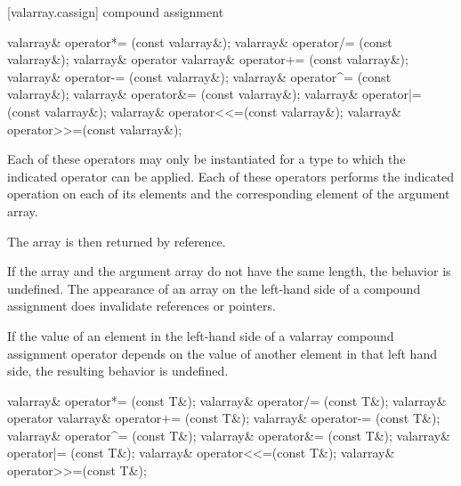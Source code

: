 [valarray.cassign]{ compound assignment}

%
%
%
%
%
%
%
%
%
%
\begin{itemdecl}
valarray& operator*= (const valarray&);
valarray& operator/= (const valarray&);
valarray& operator%
valarray& operator+= (const valarray&);
valarray& operator-= (const valarray&);
valarray& operator^= (const valarray&);
valarray& operator&= (const valarray&);
valarray& operator|= (const valarray&);
valarray& operator<<=(const valarray&);
valarray& operator>>=(const valarray&);
\end{itemdecl}

\begin{itemdescr}
\pnum
Each of these operators may only be instantiated for a type 
to which the indicated operator can be applied.
Each of these operators
performs the indicated operation on each of its elements and the
corresponding element of the argument array.

\pnum
The array is then returned by reference.

\pnum
If the array and the
argument array do not have the same length, the behavior is undefined.%
The appearance of an array on the left-hand side of a compound assignment
does  invalidate references or pointers.

\pnum
If the value of an element in the left-hand side of a valarray compound
assignment operator depends on the value of another element in that left
hand side, the resulting behavior is undefined.
\end{itemdescr}

%
%
%
%
%
%
%
%
%
%
\begin{itemdecl}
valarray& operator*= (const T&);
valarray& operator/= (const T&);
valarray& operator%
valarray& operator+= (const T&);
valarray& operator-= (const T&);
valarray& operator^= (const T&);
valarray& operator&= (const T&);
valarray& operator|= (const T&);
valarray& operator<<=(const T&);
valarray& operator>>=(const T&);
\end{itemdecl}

